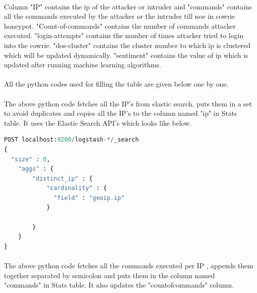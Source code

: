 \documentclass{report}
\begin{document}
 
\paragraph{}
Column "IP" contains the ip of the attacker or intruder and "commands" contains all the commands executed by the attacker or the intruder till noe in cowrie honeypot. "Count-of-commands" contains the number of commands attacker executed. "login-attempts" contains the number of times attacker tried to login into the cowrie. "dos-cluster" contains the cluster number to which ip is clustered which will be updated dynamically. "sentiment" contains the value of ip which is updated after running machine learning algorithms.

\paragraph{}
All the python codes used for filling the table are given below one by one.




\paragraph{}
The above python code fetches all the IP's from elastic search, puts them in a set to avoid duplicates and copies all the IP's to the column named "ip" in Stats table. It uses the Elastic Search API's which looks like below.

\begin{lstlisting}[language=Python, caption=Elastic Search API Request Sample,captionpos=top]
POST localhost:9200/logstash-*/_search
{
  "size" : 0,
    "aggs" : {
        "distinct_ip" : {
            "cardinality" : {
              "field" : "geoip.ip"
            }
          
        }
    }
}
\end{lstlisting}




\paragraph{}
The above python code fetches all the commands executed per IP , appends them together separated by semicolon and puts them in the column named "commands" in Stats table. It also updates the "countofcommands" column.
\end{document}
